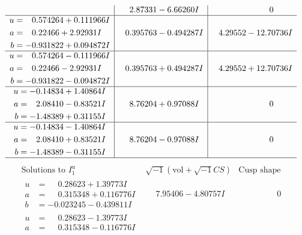 \documentclass[1p]{elsarticle_modified}
\theoremstyle{definition}
\newcommand{\I}{\sqrt{-1}}
\begin{document}
$$\begin{array}{c|c|c}
 & \phantom{-}2.87331 - 6.66260 I & \phantom{-0.000000 } 0 \\ \hline\begin{aligned}
u &= \phantom{-}0.574264 + 0.111966 I \\
a &= \phantom{-}0.22466 + 2.92931 I \\
b &= -0.931822 + 0.094872 I\end{aligned}
 & \phantom{-}0.395763 - 0.494287 I & \phantom{-}4.29552 - 12.70736 I \\ \hline\begin{aligned}
u &= \phantom{-}0.574264 - 0.111966 I \\
a &= \phantom{-}0.22466 - 2.92931 I \\
b &= -0.931822 - 0.094872 I\end{aligned}
 & \phantom{-}0.395763 + 0.494287 I & \phantom{-}4.29552 + 12.70736 I \\ \hline\begin{aligned}
u &= -0.14834 + 1.40864 I \\
a &= \phantom{-}2.08410 - 0.83521 I \\
b &= -1.48389 + 0.31155 I\end{aligned}
 & \phantom{-}8.76204 + 0.97088 I & \phantom{-0.000000 } 0 \\ \hline\begin{aligned}
u &= -0.14834 - 1.40864 I \\
a &= \phantom{-}2.08410 + 0.83521 I \\
b &= -1.48389 - 0.31155 I\end{aligned}
 & \phantom{-}8.76204 - 0.97088 I & \phantom{-0.000000 } 0\\
 \hline 
 \end{array}$$\newpage$$\begin{array}{c|c|c}  
\text{Solutions to }I^u_{1}& \I (\text{vol} + \sqrt{-1}CS) & \text{Cusp shape}\\
 \hline 
\begin{aligned}
u &= \phantom{-}0.28623 + 1.39773 I \\
a &= \phantom{-}0.315348 + 0.116776 I \\
b &= -0.023245 - 0.439811 I\end{aligned}
 & \phantom{-}7.95406 - 4.80757 I & \phantom{-0.000000 } 0 \\ \hline\begin{aligned}
u &= \phantom{-}0.28623 - 1.39773 I \\
a &= \phantom{-}0.315348 - 0.116776 I \\

\end{aligned}
\end{array}$$
\end{document}
